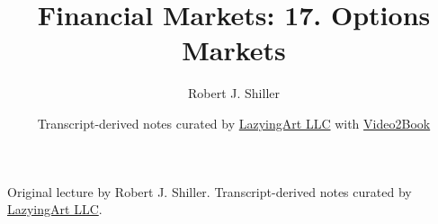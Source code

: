 \documentclass[11pt,oneside]{book}
\begin{document}
\frontmatter
\title{Financial Markets: 17. Options Markets}
\author{Robert J. Shiller}
\date{Transcript-derived notes curated by \href{https://lazying.art}{LazyingArt LLC} with \href{https://github.com/lachlanchen/Video2Book}{Video2Book}}
\maketitle
\begin{center}
\small Original lecture by Robert J. Shiller. Transcript-derived notes curated by \href{https://lazying.art}{LazyingArt LLC}.
\end{center}
\clearpage
\mainmatter

\end{document}
